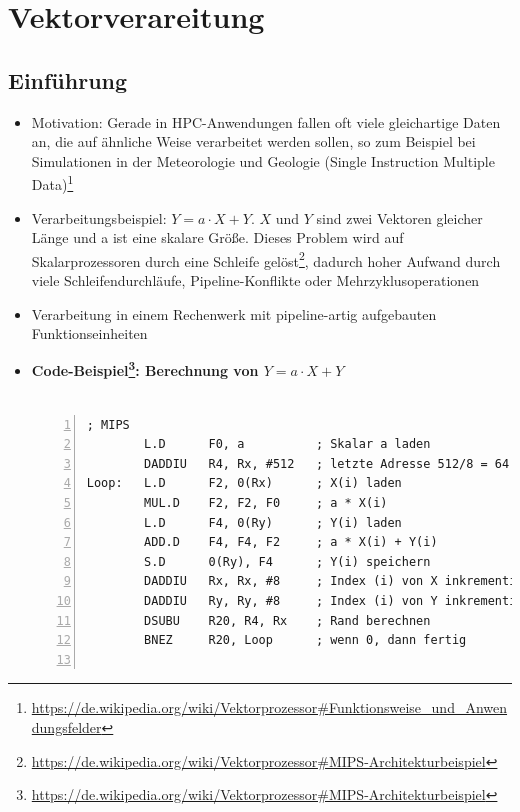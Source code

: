 \section{Vektorverareitung}

\subsection{Einführung}
\begin{itemize}
	\item Motivation: Gerade in HPC-Anwendungen fallen oft viele gleichartige Daten an, die auf ähnliche Weise verarbeitet werden sollen, so zum Beispiel bei Simulationen in der Meteorologie und Geologie (Single Instruction Multiple Data)\footnote{\url{https://de.wikipedia.org/wiki/Vektorprozessor\#Funktionsweise_und_Anwendungsfelder}}
	\item Verarbeitungsbeispiel: \(Y = a \cdot X + Y\). \(X\) und \(Y\) sind zwei Vektoren gleicher Länge und a ist eine skalare Größe. Dieses Problem wird auf Skalarprozessoren durch eine Schleife gelöst\footnote{\url{https://de.wikipedia.org/wiki/Vektorprozessor\#MIPS-Architekturbeispiel}}, dadurch hoher Aufwand durch viele Schleifendurchläufe, Pipeline-Konflikte oder Mehrzyklusoperationen
	\item Verarbeitung in einem Rechenwerk mit pipeline-artig aufgebauten Funktionseinheiten
	\item \textbf{Code-Beispiel\footnote{\url{https://de.wikipedia.org/wiki/Vektorprozessor\#MIPS-Architekturbeispiel}}: Berechnung von \(Y = a \cdot X + Y\)}\\\\
	\begin{minipage}{\linewidth}
	\begin{lstlisting}[frame=single,numbers=left,mathescape,language={[mips]Assembler},tabsize=4]
; MIPS
		L.D 	 F0, a          ; Skalar a laden
		DADDIU	 R4, Rx, #512   ; letzte Adresse 512/8 = 64
Loop:	L.D 	 F2, 0(Rx)  	; X(i) laden
		MUL.D    F2, F2, F0     ; a * X(i)
		L.D      F4, 0(Ry)      ; Y(i) laden
		ADD.D    F4, F4, F2     ; a * X(i) + Y(i)
		S.D      0(Ry), F4      ; Y(i) speichern
		DADDIU   Rx, Rx, #8     ; Index (i) von X inkrementieren
		DADDIU   Ry, Ry, #8     ; Index (i) von Y inkrementieren
		DSUBU    R20, R4, Rx    ; Rand berechnen
		BNEZ     R20, Loop      ; wenn 0, dann fertig


\end{lstlisting}
\end{minipage}
\end{itemize}
